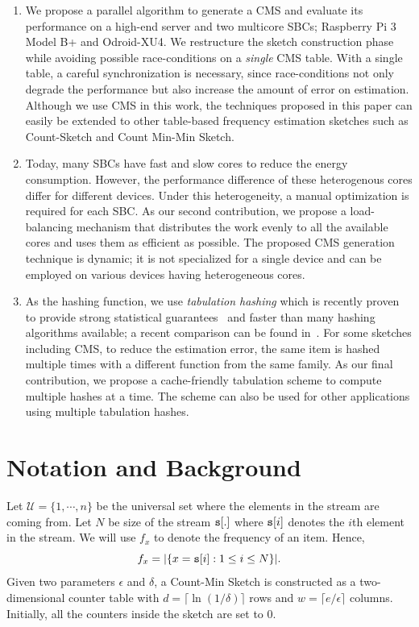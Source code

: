 \documentclass[runningheads]{llncs}
\begin{document}
\vspace{-0.2\topsep}
\begin{enumerate}[leftmargin=*]
\item We propose a parallel algorithm to generate a CMS and evaluate its performance on a high-end server and two multicore SBCs; Raspberry Pi 3 Model B+ and Odroid-XU4.  We restructure the sketch construction phase while avoiding possible race-conditions on a {\em single} CMS table. With a single table, a careful synchronization is necessary, since race-conditions not only degrade the performance but also increase the amount of error on estimation. Although we use CMS in this work, the techniques proposed in this paper can easily be extended to other table-based frequency estimation sketches such as Count-Sketch and Count Min-Min Sketch. 

\item Today, many SBCs have fast and slow cores to reduce the energy consumption.  However, the performance difference of these heterogenous cores differ for different devices. Under this heterogeneity, a manual optimization is required for each SBC. As our second contribution, we propose a load-balancing mechanism that distributes the work evenly to all the available cores and uses them as efficient as possible. The proposed CMS generation technique is dynamic; it is not specialized for a single device and can be employed on various devices having heterogeneous cores. 

\item 
As the hashing function, we use {\em tabulation hashing} which is recently proven to provide strong statistical guarantees~\cite{thorup2017} and faster than many hashing algorithms available; a recent comparison can be found in~\cite{Dahlgaard2017}. For some sketches including CMS, to reduce the estimation error, the same item is hashed multiple times with a different function from the same family. As our final contribution, we propose a cache-friendly tabulation scheme to compute multiple hashes at a time. The scheme can also be used for other applications using multiple tabulation hashes.
\end{enumerate}
\vspace{-0.2\topsep}

 \section{Notation and Background}\label{sec:not}

Let $\mathcal{U} = \{1,\cdots,n\}$ be the universal set where the elements in the stream are coming from. 
Let $N$ be size of the stream ${\tt s}[.]$ where ${\tt s}[i]$ denotes the $i$th element in the stream.
We will use $f_x$ to denote the frequency of an item. Hence, $$f_x = |\{x = {\tt s}[i]: 1 \leq i \leq N\}|.$$
Given two parameters $\epsilon$ and $\delta$, a Count-Min Sketch is constructed as a two-dimensional counter table with 
$d = \lceil \ln(1/\delta) \rceil$ rows and $w = \lceil e/\epsilon \rceil$ columns. Initially, all the counters inside the sketch are set to $0$. 
\end{document}
